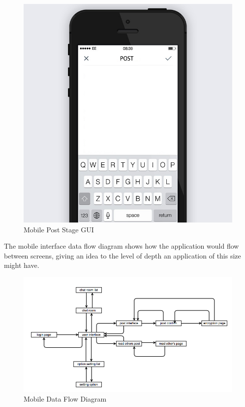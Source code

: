 \begin{figure}[h]
    \centering
    \includegraphics[width=\textwidth]{images/design/mobile_post.jpg}
    \caption{Mobile Post Stage GUI}
    \label{fig:mobile_post}
\end{figure}

The mobile interface data flow diagram shows how the application would flow 
between screens, giving an idea to the level of depth an application of this 
size might have.

\begin{figure}[h]
    \centering
    \includegraphics[width=\textwidth]{images/design/mobile_flow_diag.png}
    \caption{Mobile Data Flow Diagram}
    \label{fig:mobile_flow}
\end{figure}
